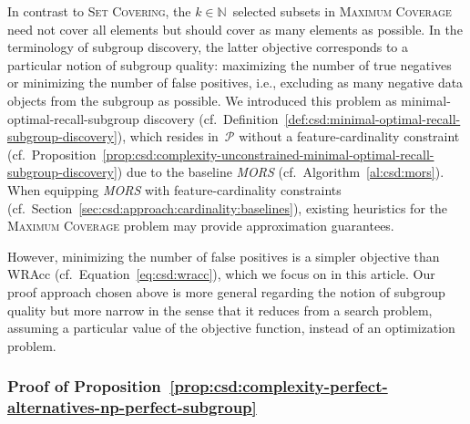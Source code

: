 \documentclass{article}
\theoremstyle{definition}
\begin{document}
In contrast to \textsc{Set Covering}, the $k \in \mathbb{N}$~selected subsets in \textsc{Maximum Coverage} need not cover all elements but should cover as many elements as possible.
In the terminology of subgroup discovery, the latter objective corresponds to a particular notion of subgroup quality:
maximizing the number of true negatives or minimizing the number of false positives, i.e., excluding as many negative data objects from the subgroup as possible.
We introduced this problem as minimal-optimal-recall-subgroup discovery (cf.~Definition~\ref{def:csd:minimal-optimal-recall-subgroup-discovery}), which resides in~$\mathcal{P}$ without a feature-cardinality constraint (cf.~Proposition~\ref{prop:csd:complexity-unconstrained-minimal-optimal-recall-subgroup-discovery}) due to the baseline \emph{MORS} (cf.~Algorithm~\ref{al:csd:mors}).
When equipping \emph{MORS} with feature-cardinality constraints (cf.~Section~\ref{sec:csd:approach:cardinality:baselines}), existing heuristics for the \textsc{Maximum Coverage} problem may provide approximation guarantees.

However, minimizing the number of false positives is a simpler objective than WRAcc (cf.~Equation~\ref{eq:csd:wracc}), which we focus on in this article.
Our proof approach chosen above is more general regarding the notion of subgroup quality but more narrow in the sense that it reduces from a search problem, assuming a particular value of the objective function, instead of an optimization problem.

\subsubsection{Proof of Proposition~\ref{prop:csd:complexity-perfect-alternatives-np-perfect-subgroup}}
\label{sec:csd:appendix:proofs:complexity-perfect-alternatives-np-perfect-subgroup}
\end{document}
